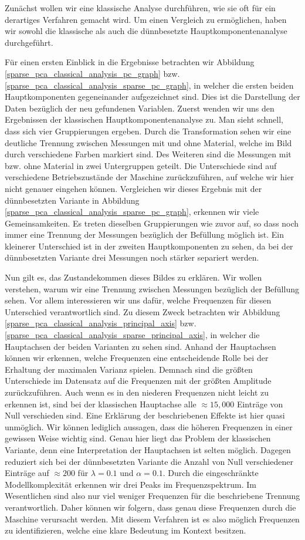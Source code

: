 Zunächst wollen wir eine klassische Analyse durchführen, wie sie oft für ein derartiges Verfahren gemacht wird. Um einen Vergleich zu ermöglichen, haben wir sowohl die klassische als auch die dünnbesetzte Hauptkomponentenanalyse durchgeführt. 

Für einen ersten Einblick in die Ergebnisse betrachten wir Abbildung \ref{sparse_pca_classical_analysis_pc_graph} bzw. \ref{sparse_pca_classical_analysis_sparse_pc_graph}, in welcher die ersten beiden Hauptkomponenten gegeneinander aufgezeichnet sind. Dies ist die Darstellung der Daten bezüglich der neu gefundenen Variablen. Zuerst wenden wir uns den Ergebnissen der klassischen Hauptkomponentenanalyse zu. Man sieht schnell, dass sich vier Gruppierungen ergeben. Durch die Transformation sehen wir eine deutliche Trennung zwischen Messungen mit und ohne Material, welche im Bild durch verschiedene Farben markiert sind. Des Weiteren sind die Messungen mit bzw. ohne Material in zwei Untergruppen geteilt. Die Unterschiede sind auf verschiedene Betriebszustände der Maschine zurückzuführen, auf welche wir hier nicht genauer eingehen können. Vergleichen wir dieses Ergebnis mit der dünnbesetzten Variante in Abbildung \ref{sparse_pca_classical_analysis_sparse_pc_graph}, erkennen wir viele Gemeinsamkeiten. Es treten dieselben Gruppierungen wie zuvor auf, so dass noch immer eine Trennung der Messungen bezüglich der Befüllung möglich ist. Ein kleinerer Unterschied ist in der zweiten Hauptkomponenten zu sehen, da bei der dünnbesetzten Variante drei Messungen noch stärker separiert werden.

Nun gilt es, das Zustandekommen dieses Bildes zu erklären. Wir wollen verstehen, warum wir eine Trennung zwischen Messungen bezüglich der Befüllung sehen. Vor allem interessieren wir uns dafür, welche Frequenzen für diesen Unterschied verantwortlich sind. Zu diesem Zweck betrachten wir Abbildung \ref{sparse_pca_classical_analysis_principal_axis} bzw. \ref{sparse_pca_classical_analysis_sparse_principal_axis}, in welcher die Hauptachsen der beiden Varianten zu sehen sind. Anhand der Hauptachsen können wir erkennen, welche Frequenzen eine entscheidende Rolle bei der Erhaltung der maximalen Varianz spielen. Demnach sind die größten Unterschiede im Datensatz auf die Frequenzen mit der größten Amplitude zurückzuführen. Auch wenn es in den niederen Frequenzen nicht leicht zu erkennen ist, sind bei der klassischen Hauptachse alle $\approx 15,000$ Einträge von Null verschieden sind. Eine Erklärung der beschriebenen Effekte ist hier quasi unmöglich. Wir können lediglich aussagen, dass die höheren Frequenzen in einer gewissen Weise wichtig sind. Genau hier liegt das Problem der klassischen Variante, denn eine Interpretation der Hauptachsen ist selten möglich. Dagegen reduziert sich bei der dünnbesetzten Variante die Anzahl von Null verschiedener Einträge auf $\approx 200$ für $\lambda = 0.1$ und $\alpha = 0.1$. Durch die eingeschränkte Modellkomplexität erkennen wir drei Peaks im Frequenzspektrum. Im Wesentlichen sind also nur viel weniger Frequenzen für die beschriebene Trennung verantwortlich. Daher können wir folgern, dass genau diese Frequenzen durch die Maschine verursacht werden. Mit diesem Verfahren ist es also möglich Frequenzen zu identifizieren, welche eine klare Bedeutung im Kontext besitzen.

